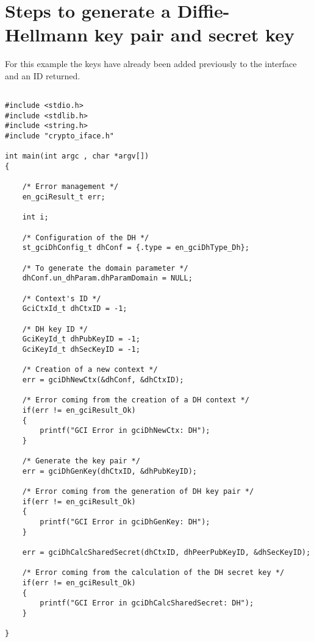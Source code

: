 \section{Steps to generate a Diffie-Hellmann key pair and secret key}

For this example the keys have already been added previously to the interface 
and an ID returned.

\begin{lstlisting}

#include <stdio.h>
#include <stdlib.h>
#include <string.h>
#include "crypto_iface.h"

int main(int argc , char *argv[])
{

    /* Error management */
    en_gciResult_t err;

    int i;

    /* Configuration of the DH */
    st_gciDhConfig_t dhConf = {.type = en_gciDhType_Dh};

    /* To generate the domain parameter */
    dhConf.un_dhParam.dhParamDomain = NULL;

    /* Context's ID */
    GciCtxId_t dhCtxID = -1;

    /* DH key ID */
    GciKeyId_t dhPubKeyID = -1;
    GciKeyId_t dhSecKeyID = -1;

    /* Creation of a new context */
    err = gciDhNewCtx(&dhConf, &dhCtxID);

    /* Error coming from the creation of a DH context */
    if(err != en_gciResult_Ok)
    {
        printf("GCI Error in gciDhNewCtx: DH");
    }

    /* Generate the key pair */
    err = gciDhGenKey(dhCtxID, &dhPubKeyID);

    /* Error coming from the generation of DH key pair */
    if(err != en_gciResult_Ok)
    {
        printf("GCI Error in gciDhGenKey: DH");
    }

    err = gciDhCalcSharedSecret(dhCtxID, dhPeerPubKeyID, &dhSecKeyID);

    /* Error coming from the calculation of the DH secret key */
    if(err != en_gciResult_Ok)
    {
        printf("GCI Error in gciDhCalcSharedSecret: DH");
    }

}
\end{lstlisting}
